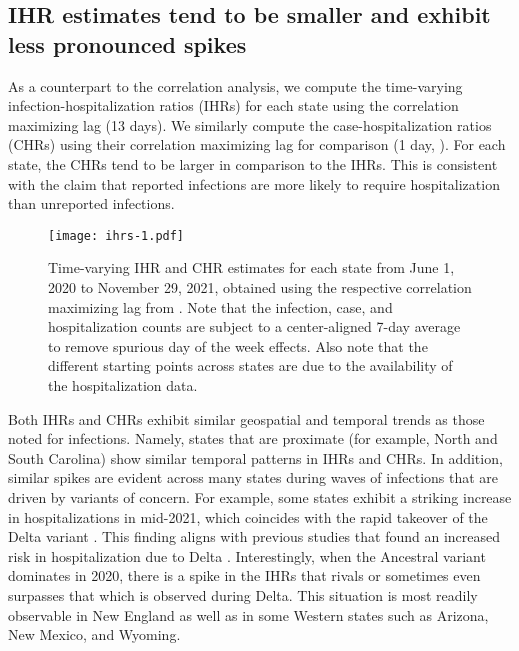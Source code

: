 \subsection{IHR estimates tend to be smaller and exhibit less pronounced spikes}
\label{sec:ihrs}

As a counterpart to the correlation analysis, we compute the time-varying
infection-hospitalization ratios (IHRs) for each state using the correlation
maximizing lag (13 days). We similarly compute the case-hospitalization ratios
(CHRs) using their correlation maximizing lag for comparison (1 day,
). For each state, the CHRs tend to be larger in comparison
to the IHRs. This is consistent with the claim that reported infections are more
likely to require hospitalization than unreported infections. 


\begin{figure}[!tb]
\centering
\texttt{[image: ihrs-1.pdf]}
\caption{Time-varying IHR and CHR estimates for each state from June 1, 2020 to
November 29, 2021, obtained using the respective correlation maximizing lag from
. Note that the infection, case, and
hospitalization counts are subject to a center-aligned 7-day average to remove
spurious day of the week effects. Also note that the different starting points
across states are due to the availability of the hospitalization data.}
\label{fig:IHR_7dav}
\end{figure}


Both IHRs and CHRs exhibit similar geospatial and temporal trends as those noted
for infections. Namely, states that are proximate (for example, North and South
Carolina) show similar temporal patterns in IHRs and CHRs. In addition, similar
spikes are evident across many states during waves of infections that are driven
by variants of concern. For example, some states exhibit a striking increase in
hospitalizations in mid-2021, which coincides with the rapid takeover of the
Delta variant \citep{hodcroft2021covariants}. This finding aligns with previous
studies that found an increased risk in hospitalization due to Delta
\citep{twohig2022hospital, nyberg2022comparative}. Interestingly, when the
Ancestral variant dominates in 2020, there is a spike in the IHRs that rivals or
sometimes even surpasses that which is observed during Delta. This situation is
most readily observable in New England as well as in some Western states such as
Arizona, New Mexico, and Wyoming.

